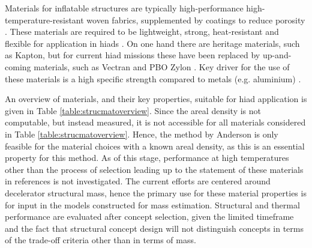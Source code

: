 Materials for inflatable structures are typically high-performance high-temperature-resistant woven fabrics, supplemented by coatings to reduce porosity \cite{Jenkins2001}. These materials are required to be lightweight, strong, heat-resistant and flexible for application in \glspl{hiad} \cite{Samareh2011}. On one hand there are heritage materials, such as Kapton, but for current \gls{hiad} missions these have been replaced by up-and-coming materials, such as Vectran and PBO Zylon \cite{Dillman2012,  Smith2010}. Key driver for the use of these materials is a high specific strength compared to metals (e.g. aluminium) \cite{Samareh2011}. 

An overview of materials, and their key properties, suitable for \gls{hiad} application is given in Table \ref{table:strucmatoverview}. Since the areal density is not computable, but instead measured, it is not accessible for all materials considered in Table \ref{table:strucmatoverview}. Hence, the method by Anderson \cite{Anderson1969} is only feasible for the material choices with a known areal density, as this is an essential property for this method. As of this stage, performance at high temperatures other than the process of selection leading up to the statement of these materials in references \cite{Dillman2012, Smith2010} is not investigated. The current efforts are centered around decelerator structural mass, hence the primary use for these material properties is for input in the models constructed for mass estimation. Structural and thermal performance are evaluated after concept selection, given the limited timeframe and the fact that structural concept design will not distinguish concepts in terms of the trade-off criteria other than in terms of mass.

